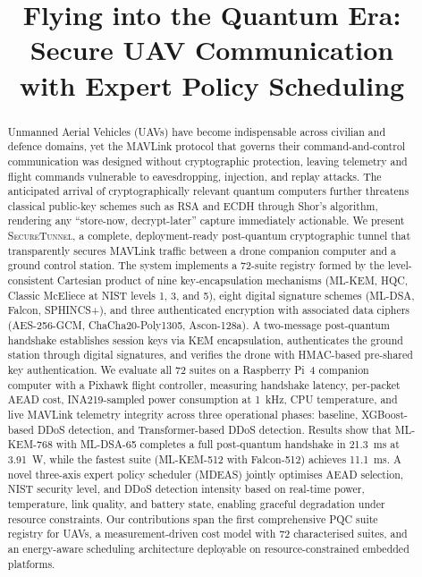 \documentclass[conference]{IEEEtran}
\newcommand{\sys}{\textsc{SecureTunnel}}
\begin{document}
\title{Flying into the Quantum Era: Secure UAV Communication\\with Expert Policy Scheduling}

\author{
}

\maketitle

\begin{abstract}
Unmanned Aerial Vehicles (UAVs) have become indispensable across civilian and defence domains, yet the MAVLink protocol that governs their command-and-control communication was designed without cryptographic protection, leaving telemetry and flight commands vulnerable to eavesdropping, injection, and replay attacks.
The anticipated arrival of cryptographically relevant quantum computers further threatens classical public-key schemes such as RSA and ECDH through Shor's algorithm, rendering any ``store-now, decrypt-later'' capture immediately actionable.
We present \sys{}, a complete, deployment-ready post-quantum cryptographic tunnel that transparently secures MAVLink traffic between a drone companion computer and a ground control station.
The system implements a 72-suite registry formed by the level-consistent Cartesian product of nine key-encapsulation mechanisms (ML-KEM, HQC, Classic McEliece at NIST levels 1, 3, and 5), eight digital signature schemes (ML-DSA, Falcon, SPHINCS+), and three authenticated encryption with associated data ciphers (AES-256-GCM, ChaCha20-Poly1305, Ascon-128a).
A two-message post-quantum handshake establishes session keys via KEM encapsulation, authenticates the ground station through digital signatures, and verifies the drone with HMAC-based pre-shared key authentication.
We evaluate all 72 suites on a Raspberry Pi~4 companion computer with a Pixhawk flight controller, measuring handshake latency, per-packet AEAD cost, INA219-sampled power consumption at \SI{1}{\kilo\hertz}, CPU temperature, and live MAVLink telemetry integrity across three operational phases: baseline, XGBoost-based DDoS detection, and Transformer-based DDoS detection.
Results show that ML-KEM-768 with ML-DSA-65 completes a full post-quantum handshake in \SI{21.3}{\milli\second} at \SI{3.91}{\watt}, while the fastest suite (ML-KEM-512 with Falcon-512) achieves \SI{11.1}{\milli\second}.
A novel three-axis expert policy scheduler (MDEAS) jointly optimises AEAD selection, NIST security level, and DDoS detection intensity based on real-time power, temperature, link quality, and battery state, enabling graceful degradation under resource constraints.
Our contributions span the first comprehensive PQC suite registry for UAVs, a measurement-driven cost model with 72 characterised suites, and an energy-aware scheduling architecture deployable on resource-constrained embedded platforms.
\end{abstract}
\end{document}
